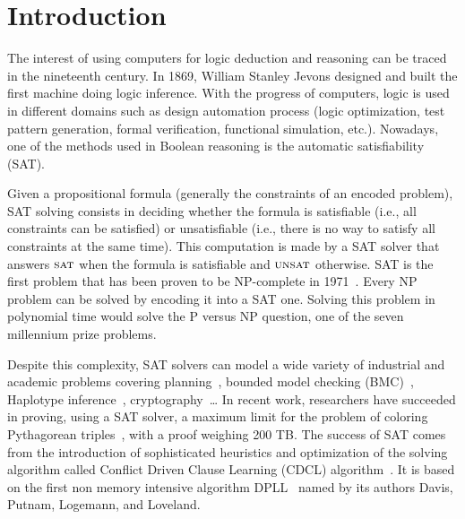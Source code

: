\chapter{Introduction}\label{chap:intro}

The interest of using computers for logic deduction and reasoning can be traced in the nineteenth century.
In 1869,  William Stanley Jevons designed and built the first machine doing logic inference.
With the progress of computers, logic is used in different domains such as design automation process 
(logic optimization, test pattern generation, formal verification, functional simulation, etc.).
Nowadays, one of the methods used in Boolean reasoning is the automatic satisfiability (SAT).

Given a propositional formula (generally the constraints of an encoded problem),
SAT solving consists in deciding whether the formula is satisfiable (i.e., all constraints can be
satisfied) or unsatisfiable (i.e., there is no way to satisfy all constraints at the same time).
This computation is made by a SAT solver that answers $\textsc{sat}$ when the formula is satisfiable
and $\textsc{unsat}$ otherwise.
SAT is the first problem that has been proven to be NP-complete in 1971~\cite{cook1971complexity}. 
Every NP problem can be solved by encoding it into a SAT one. Solving this problem in 
polynomial time would solve the P versus NP question, one of the seven millennium prize problems.


Despite this complexity, SAT solvers can model a wide variety of industrial and academic problems
covering planning~\cite{planning_92}, bounded model checking (BMC)~\cite{bmc_99}, Haplotype inference~\cite{biology_06}, cryptography~\cite{crypto_00}\ldots
In recent work, researchers have succeeded in proving, using a SAT solver, a maximum limit
for the problem of coloring Pythagorean triples~\cite{heule2016solving}, with a proof weighing 200 TB.
The success of SAT comes from the introduction of sophisticated heuristics and optimization of the solving 
algorithm called Conflict Driven Clause Learning (CDCL) algorithm~\cite{marques1999grasp}.
 It is based on the first non memory intensive algorithm DPLL~\cite{dpll_62} named by its authors Davis, Putnam, Logemann, and Loveland.

